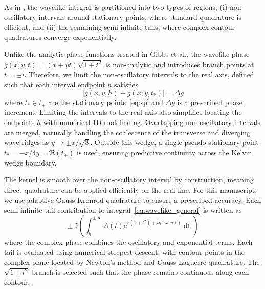 \documentclass[]{JFM-FLM_Au}
\newcommand{\di}[1]{\mathop{\mathrm{d}#1}} %
\begin{document}
As in \cite{gibbs_numerical_2024}, the wavelike integral is partitioned into two types of regions; (i) non-oscillatory intervals around stationary points, where standard quadrature is efficient, and (ii) the remaining semi-infinite tails, where complex contour quadratures converge exponentially. 

Unlike the analytic phase functions treated in Gibbs et al., the wavelike phase $g(x,y,t) = (x+yt)\sqrt{1+t^2}$ is non-analytic and introduces branch points at $t = \pm i$. Therefore, we limit the non-oscillatory intervals to the real axis, defined such that each interval endpoint $h$ satisfies
\[
|g(x,y,h) - g(x,y,t_*)| = \Delta g
\]
where $t_*\in t_\pm$ are the stationary points~\eqref{eq:sp} and $\Delta g$ is a prescribed phase increment. Limiting the 
intervals to the real axis also simplifies locating the endpoints $h$ with numerical 1D root-finding. Overlapping non-oscillatory intervals are merged, naturally handling the coalescence of the transverse and diverging wave ridges as $y\to \pm x/\sqrt{8}$. Outside this wedge, a single pseudo-stationary point $t_*=-x/4y=\Re(t_\pm)$ is used, ensuring predictive continuity across the Kelvin wedge boundary. 

The kernel is smooth over the non-oscillatory interval by construction, meaning direct quadrature can be applied efficiently on the real line. For this manuscript, we use adaptive Gauss-Kronrod quadrature to ensure a prescribed accuracy. Each semi-infinite tail contribution to integral~\eqref{eq:wavelike_general} is written as
\[
 \pm\,\Im\left(\int_h^{\pm\infty} A(t) e^{z(1+t^2)+ig(x,y,t)}\di t \right) 
\]
where the complex phase combines the oscillatory and exponential terms. Each tail is evaluated using numerical steepest descent, with contour points in the complex plane located by Newton's method and Gauss-Laguerre quadrature. The $\sqrt{1+t^2}$ branch is selected such that the phase remains continuous along each contour.
\end{document}
